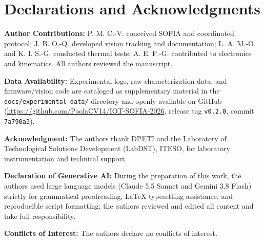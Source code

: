 \documentclass[lettersize,journal]{IEEEtran}
\begin{document}
	
	\section*{Declarations and Acknowledgments}
	\footnotesize
	\textbf{Author Contributions:} P. M. C.-V. conceived SOFIA and coordinated protocol; J. B. O.-Q. developed vision tracking and documentation; L. A. M.-O. and K. I. S.-G. conducted thermal tests; A. E. F.-G. contributed to electronics and kinematics. All authors reviewed the manuscript.
	
	\textbf{Data Availability:} Experimental logs, raw characterization data, and firmware/vision code are cataloged as supplementary material in the \texttt{docs/experimental-data/} directory and openly available on GitHub (\url{https://github.com/PaolaCV14/IOT-SOFIA-2026}, release tag \texttt{v0.2.0}, commit \texttt{7a790a3}).
	
	\textbf{Acknowledgment:} The authors thank DPETI and the Laboratory of Technological Solutions Development (LabDST), ITESO, for laboratory instrumentation and technical support.
	
	\textbf{Declaration of Generative AI:} During the preparation of this work, the authors used large language models (Claude 5.5 Sonnet and Gemini 3.8 Flash) strictly for grammatical proofreading, LaTeX typesetting assistance, and reproducible script formatting; the authors reviewed and edited all content and take full responsibility.
	
	\textbf{Conflicts of Interest:} The authors declare no conflicts of interest.
	\normalsize
	
	\balance
	
	
	
\end{document}
